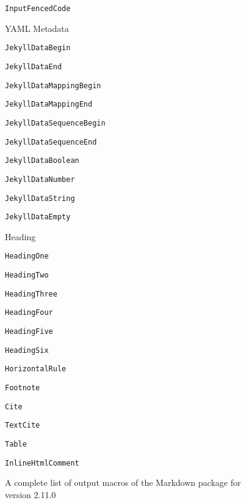 \documentclass[
  digital,     %
  oneside,     %
  nosansbold,  %
  nocolorbold, %
  lof,         %
  lot,         %
]{fithesis4}
\begin{document}
\begin{figure}
\begin{multicols}{2}
\begin{compactenum}
\begin{compactenum}
        \item \texttt{InputFencedCode}
      \end{compactenum}
      \item YAML Metadata
      \begin{compactenum}  %
        \item \texttt{JekyllDataBegin}
        \item \texttt{JekyllDataEnd}
        \item \texttt{JekyllDataMappingBegin}
        \item \texttt{JekyllDataMappingEnd}
        \item \texttt{JekyllDataSequenceBegin}
        \item \texttt{JekyllDataSequenceEnd}
        \item \texttt{JekyllDataBoolean}
        \item \texttt{JekyllDataNumber}
        \item \texttt{JekyllDataString}
        \item \texttt{JekyllDataEmpty}
      \end{compactenum}
      \item Heading
      \begin{compactenum}
        \item \texttt{HeadingOne}
        \item \texttt{HeadingTwo}
        \item \texttt{HeadingThree}
        \item \texttt{HeadingFour}
        \item \texttt{HeadingFive}
        \item \texttt{HeadingSix}
      \end{compactenum}
      \item \texttt{HorizontalRule}
      \item \texttt{Footnote}
      \item \texttt{Cite}
      \item \texttt{TextCite}
      \item \texttt{Table}
      \item \texttt{InlineHtmlComment}
    \end{compactenum}
  \end{multicols}
  \vspace*{-1em}
  \caption{A complete list of output macros of the Markdown package for version 2.11.0}
  \label{fig:markdown-renderers}
\end{figure}
\end{document}
